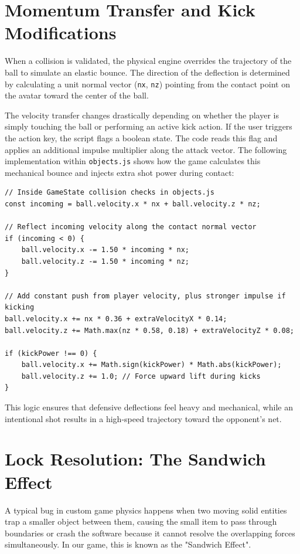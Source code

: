 \section{Momentum Transfer and Kick Modifications}
When a collision is validated, the physical engine overrides the trajectory of the ball to simulate an elastic bounce. The direction of the deflection is determined by calculating a unit normal vector (\texttt{nx}, \texttt{nz}) pointing from the contact point on the avatar toward the center of the ball.

The velocity transfer changes drastically depending on whether the player is simply touching the ball or performing an active kick action. If the user triggers the action key, the script flags a boolean state. The code reads this flag and applies an additional impulse multiplier along the attack vector. The following implementation within \texttt{objects.js} shows how the game calculates this mechanical bounce and injects extra shot power during contact:

\begin{lstlisting}[style=vscode_JS]
// Inside GameState collision checks in objects.js
const incoming = ball.velocity.x * nx + ball.velocity.z * nz;

// Reflect incoming velocity along the contact normal vector
if (incoming < 0) {
    ball.velocity.x -= 1.50 * incoming * nx;
    ball.velocity.z -= 1.50 * incoming * nz;
}

// Add constant push from player velocity, plus stronger impulse if kicking
ball.velocity.x += nx * 0.36 + extraVelocityX * 0.14;
ball.velocity.z += Math.max(nz * 0.58, 0.18) + extraVelocityZ * 0.08;

if (kickPower !== 0) {
    ball.velocity.x += Math.sign(kickPower) * Math.abs(kickPower);
    ball.velocity.z += 1.0; // Force upward lift during kicks
}
\end{lstlisting}

This logic ensures that defensive deflections feel heavy and mechanical, while an intentional shot results in a high-speed trajectory toward the opponent's net.

\section{Lock Resolution: The Sandwich Effect}
A typical bug in custom game physics happens when two moving solid entities trap a smaller object between them, causing the small item to pass through boundaries or crash the software because it cannot resolve the overlapping forces simultaneously. In our game, this is known as the "Sandwich Effect".

